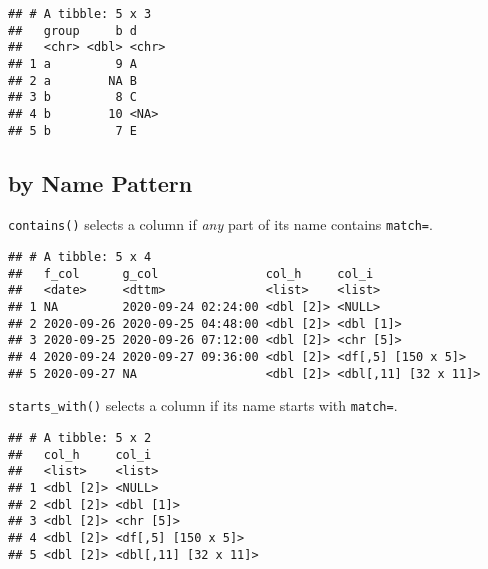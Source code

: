 \documentclass[
]{book}
\newenvironment{Shaded}{\begin{snugshade}}{\end{snugshade}}
\newcommand{\DataTypeTok}[1]{\textcolor[rgb]{0.13,0.29,0.53}{#1}}
\newcommand{\KeywordTok}[1]{\textcolor[rgb]{0.13,0.29,0.53}{\textbf{#1}}}
\newcommand{\NormalTok}[1]{#1}
\newcommand{\OperatorTok}[1]{\textcolor[rgb]{0.81,0.36,0.00}{\textbf{#1}}}
\newcommand{\StringTok}[1]{\textcolor[rgb]{0.31,0.60,0.02}{#1}}
\begin{document}
\begin{verbatim}
## # A tibble: 5 x 3
##   group     b d    
##   <chr> <dbl> <chr>
## 1 a         9 A    
## 2 a        NA B    
## 3 b         8 C    
## 4 b        10 <NA> 
## 5 b         7 E
\end{verbatim}

\hypertarget{by-name-pattern}{%
\subsection{by Name Pattern}\label{by-name-pattern}}

\texttt{contains()} selects a column if \emph{any} part of its name contains \texttt{match=}.

\begin{Shaded}
\end{Shaded}

\begin{verbatim}
## # A tibble: 5 x 4
##   f_col      g_col               col_h     col_i               
##   <date>     <dttm>              <list>    <list>              
## 1 NA         2020-09-24 02:24:00 <dbl [2]> <NULL>              
## 2 2020-09-26 2020-09-25 04:48:00 <dbl [2]> <dbl [1]>           
## 3 2020-09-25 2020-09-26 07:12:00 <dbl [2]> <chr [5]>           
## 4 2020-09-24 2020-09-27 09:36:00 <dbl [2]> <df[,5] [150 x 5]>  
## 5 2020-09-27 NA                  <dbl [2]> <dbl[,11] [32 x 11]>
\end{verbatim}

\texttt{starts\_with()} selects a column if its name starts with \texttt{match=}.

\begin{Shaded}
\end{Shaded}

\begin{verbatim}
## # A tibble: 5 x 2
##   col_h     col_i               
##   <list>    <list>              
## 1 <dbl [2]> <NULL>              
## 2 <dbl [2]> <dbl [1]>           
## 3 <dbl [2]> <chr [5]>           
## 4 <dbl [2]> <df[,5] [150 x 5]>  
## 5 <dbl [2]> <dbl[,11] [32 x 11]>
\end{verbatim}
\end{document}
